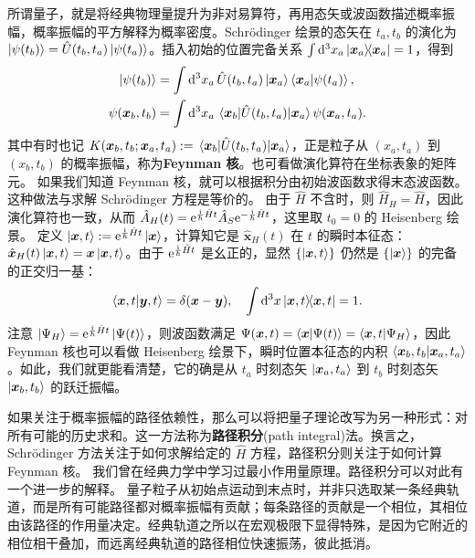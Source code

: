 所谓量子，就是将经典物理量提升为非对易算符，再用态矢或波函数描述概率振幅，概率振幅的平方解释为概率密度。Schr\"odinger 绘景的态矢在 $t_a,t_b$ 的演化为 $\ket{\psi(t_b)}=\hat U(t_b,t_a)\ket{\psi(t_a)}$。插入初始的位置完备关系 $\int\dd[3]{x_a}\op{\bm x_a}=1$，得到
\begin{align}
    \ket{\psi(t_b)}&=\int\d[3]{x_a}\hat U(t_b,t_a)\ket{\bm x_a} \ip{\bm x_a}{\psi(t_a)},\\
    \psi(\bm x_b,t_b) & = \int\d[3]{x_a} \mel{\bm x_b}{\hat U(t_b,t_a)}{\bm x_a} \psi(\bm x_a,t_a).
\end{align}
其中有时也记 $K(\bm x_b,t_b;\bm x_a,t_a) := \mel{\bm x_b}{\hat U(t_b,t_a)}{\bm x_a}$，正是粒子从 $(x_a,t_a)$ 到 $(x_b,t_b)$ 的概率振幅，称为\textbf{Feynman 核}。也可看做演化算符在坐标表象的矩阵元。
如果我们知道 Feynman 核，就可以根据积分由初始波函数求得末态波函数。这种做法与求解 Schrödinger 方程是等价的。
由于 $\hat H$ 不含时，则 $\hat H_H=\hat H$，因此演化算符也一致，从而 $\hat A_H(t)=\mathrm{e}^{\frac{\mathrm{i}}{\hbar}\hat H t}\hat A_S\mathrm{e}^{-\frac{\mathrm{i}}{\hbar}\hat H t}$，这里取 $t_0=0$ 的 Heisenberg 绘景。
定义 $\ket{\bm x,t}:=\mathrm{e}^{\frac{\mathrm{i}}{\hbar}\hat H t}\ket{\bm x}$，计算知它是 $\hat{\bm x}_H(t)$ 在 $t$ 的瞬时本征态：$\hat{\bm x}_H(t)\ket{\bm x,t}=\bm x\ket{\bm x,t}$。由于 $\mathrm{e}^{\frac{\mathrm{i}}{\hbar}\hat H t}$ 是幺正的，显然 $\{\ket{\bm x,t}\}$ 仍然是 $\{\ket{\bm x}\}$ 的完备的正交归一基：
\[\ip{\bm x,t}{\bm y,t}=\delta(\bm x-\bm y),\quad \int\d[3]{x}\op{\bm x,t}=1.\]
注意 $\ket{\Psi_H}=\mathrm{e}^{\frac{\mathrm{i}}{\hbar}\hat H t}\ket{\Psi(t)}$，则波函数满足 $\Psi(\bm x,t) = \ip{\bm x}{\Psi(t)} = \ip{\bm x,t}{\Psi_H}$，因此 Feynman 核也可以看做 Heisenberg 绘景下，瞬时位置本征态的内积 $\ip{\bm x_b,t_b}{\bm x_a,t_a}$。如此，我们就更能看清楚，它的确是从 $t_a$ 时刻态矢 $\ket{\bm x_a,t_a}$ 到 $t_b$ 时刻态矢 $\ket{\bm x_b,t_b}$ 的跃迁振幅。



如果关注于概率振幅的路径依赖性，那么可以将把量子理论改写为另一种形式：对所有可能的历史求和。这一方法称为\textbf{路径积分}(path integral)法。换言之，Schr\"odinger 方法关注于如何求解给定的 $\hat H$ 方程，路径积分则关注于如何计算 Feynman 核。
我们曾在经典力学中学习过最小作用量原理。路径积分可以对此有一个进一步的解释。
量子粒子从初始点运动到末点时，并非只选取某一条经典轨道，而是所有可能路径都对概率振幅有贡献；每条路径的贡献是一个相位，其相位由该路径的作用量决定。经典轨道之所以在宏观极限下显得特殊，是因为它附近的相位相干叠加，而远离经典轨道的路径相位快速振荡，彼此抵消。

